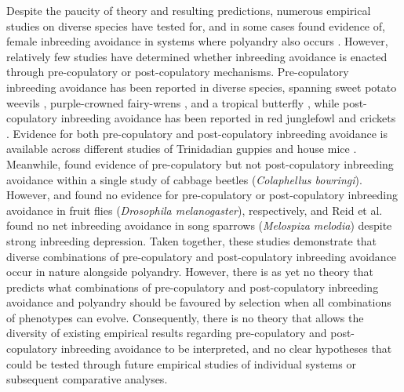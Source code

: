 \documentclass[10pt,letterpaper]{article}
\begin{document}
Despite the paucity of theory and resulting predictions, numerous empirical studies on diverse species have tested for, and in some cases found evidence of, female inbreeding avoidance in systems where polyandry also occurs \cite[][but see \citealt{Reid2015a}]{Tregenza2002, Varian-Ramos2012, Kingma2013, Arct2015}. However, relatively few studies have determined whether inbreeding avoidance is enacted through pre-copulatory or post-copulatory mechanisms. Pre-copulatory inbreeding avoidance has been reported in diverse species, spanning sweet potato weevils \cite[\textit{Cylas formicarius};][]{Kuriwada2011}, purple-crowned fairy-wrens \cite[\textit{Malurus coronatus};][]{Kuriwada2011}, and a tropical butterfly \cite[\textit{Bicyclus anynana};][]{Fischer2015}, while post-copulatory inbreeding avoidance has been reported in red junglefowl \cite[\textit{Gallus gallus};][]{Pizzari2004} and crickets \cite[\textit{Teleogryllus oceanicus}, \textit{Gryllus bimaculatus};][]{Simmons2006, Bretman2009}. Evidence for both pre-copulatory and post-copulatory inbreeding avoidance is available across different studies of Trinidadian guppies \cite[\textit{Poecilia reticulata};][]{Gasparini2011, Daniel2015} and house mice \cite[\textit{Mus domesticus};][]{Potts1991, Firman2015}. Meanwhile, \cite{Liu2014} found evidence of pre-copulatory but not post-copulatory inbreeding avoidance within a single study of cabbage beetles (\textit{Colaphellus bowringi}). However, \cite{Ala-Honkola2011} and \cite{Tan2012} found no evidence for pre-copulatory or post-copulatory inbreeding avoidance in fruit flies (\textit{Drosophila melanogaster}), respectively, and Reid et al. \citeyearpar{Reid2014, Reid2015} found no net inbreeding avoidance in song sparrows (\textit{Melospiza melodia}) despite strong inbreeding depression. Taken together, these studies demonstrate that diverse combinations of pre-copulatory and post-copulatory inbreeding avoidance occur in nature alongside polyandry. However, there is as yet no theory that predicts what combinations of pre-copulatory and post-copulatory inbreeding avoidance and polyandry should be favoured by selection when all combinations of phenotypes can evolve. Consequently, there is no theory that allows the diversity of existing empirical results regarding pre-copulatory and post-copulatory inbreeding avoidance to be interpreted, and no clear hypotheses that could be tested through future empirical studies of individual systems or subsequent comparative analyses.
\end{document}
